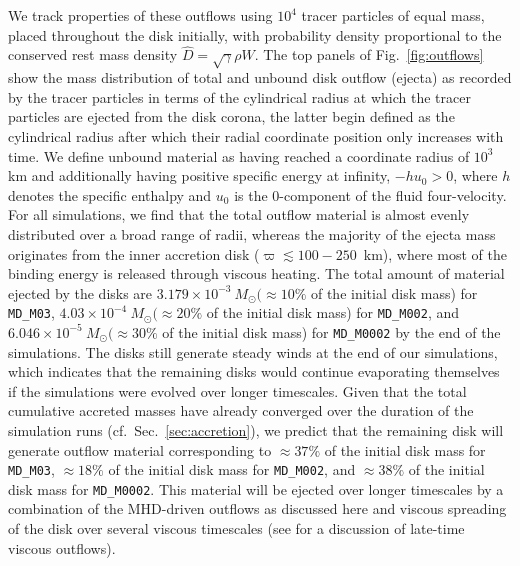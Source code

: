 We track properties of these outflows using $10^4$ tracer particles of equal mass, placed throughout the disk initially, with probability density proportional to the conserved rest mass density $\hat D = \sqrt \gamma \rho W$. The top panels of Fig.~\ref{fig:outflows} show the mass distribution of total and unbound disk outflow (ejecta) as recorded by the tracer particles in terms of the cylindrical radius at which the tracer particles are ejected from the disk corona, the latter begin defined as the cylindrical radius after which their radial coordinate position only increases with time. We define unbound material as having reached a coordinate radius of $10^3$\,km and additionally having positive specific energy at infinity, $-hu_0 > 0$, where $h$ denotes the specific enthalpy and $u_0$ is the 0-component of the fluid four-velocity. For all simulations, we find that the total outflow material is almost evenly distributed over a broad  range of radii, whereas the majority of the ejecta mass originates from the inner accretion disk ($\varpi\lesssim100-250$~km), where most of the binding energy is released through viscous heating. The total amount of material ejected by the disks are $3.179\times 10^{-3}~M_\odot (\approx 10\%$ of the initial disk mass) for \texttt{MD\_M03}, $4.03\times 10^{-4}~M_\odot (\approx 20\%$ of the initial disk mass) for \texttt{MD\_M002}, and $6.046\times 10^{-5}~M_\odot (\approx 30\%$ of the initial disk mass) for \texttt{MD\_M0002} by the end of the simulations. The disks still generate steady winds at the end of our simulations, which indicates that the remaining disks would continue evaporating themselves if the simulations were evolved over longer timescales. Given that the total cumulative accreted masses have already converged over the duration of the simulation runs (cf.~Sec.~\ref{sec:accretion}), we predict that the remaining disk will generate outflow material corresponding to $\approx\! 37\%$ of the initial disk mass for \texttt{MD\_M03}, $\approx\! 18\%$ of the initial disk mass for \texttt{MD\_M002}, and $\approx\! 38\%$ of the initial disk mass for \texttt{MD\_M0002}. This material will be ejected over longer timescales by a combination of the MHD-driven outflows as discussed here and viscous spreading of the disk over several viscous timescales (see \cite{fernandez_long-term_2019} for a discussion of late-time viscous outflows).

